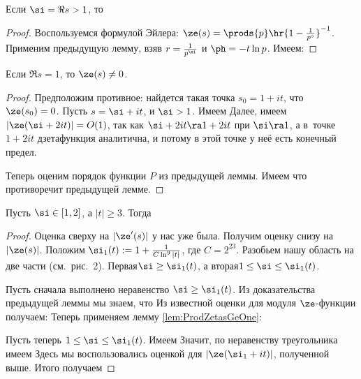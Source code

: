 \documentclass[a4paper]{article}
\begin{document}
\begin{lemma}\label{lem:ProdZetasGeOne}
Если $\si=\Re s > 1$, то
\end{lemma}
\begin{proof}
Воспользуемся формулой Эйлера: $\ze(s)=\prods{p}\hr{1-\frac1{p^s}}^{-1}$. Применим предыдущую лемму, взяв $r = \frac{1}{p^\si}$ и $\ph = -t\ln p$.
Имеем:
\hfill\end{proof}

\begin{lemma}
Если $\Re s=1$, то $\ze(s)\neq0$.
\end{lemma}
\begin{proof}
Предположим противное: найдется такая точка $s_0=1+it$, что $\ze(s_0)=0$. Пусть $s=\si+it$, и $\si>1$. Имеем
Далее, имеем $|\ze(\si+2it)|=O(1)$, так как $\si+2it\ra 1+2it$ при $\si\ra1$, а в~точке $1+2it$ дзета\д функция
аналитична, и потому в этой точке у неё есть конечный предел.

Теперь оценим порядок функции $P$ из предыдущей леммы. Имеем
что противоречит предыдущей лемме.
\end{proof}

\begin{lemma}
Пусть $\si \in [1,2]$, а $|t|\ge 3$. Тогда
\end{lemma}

\begin{proof}
Оценка сверху на $|\ze'(s)|$ у нас уже была. Получим оценку снизу на $|\ze(s)|$.
Положим $\si_1(t) := 1+\frac1{C\ln^9|t|}$, где $C=2^{23}$.
Разобьем нашу область на две части (см.~рис.~2). Первая\т $\si\ge \si_1(t)$, а
вторая\т $1\le\si\le\si_1(t)$.

 Пусть сначала выполнено неравенство $\si \ge \si_1(t)$. Из доказательства предыдущей леммы мы знаем, что
Из известной оценки для модуля $\ze$-функции получаем:
Теперь применяем лемму \ref{lem:ProdZetasGeOne}:

 Пусть теперь $1 \le \si \le \si_1(t)$. Имеем
Значит, по неравенству треугольника имеем
Здесь мы воспользовались оценкой для $|\ze(\si_1+it)|$, полученной выше.
Итого получаем
\hfill\end{proof}
\end{document}
